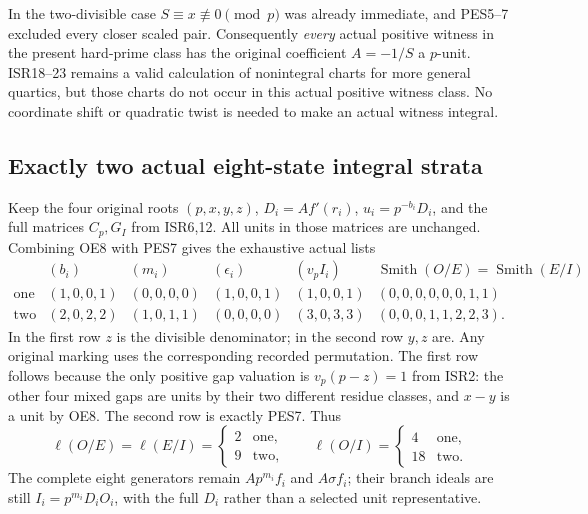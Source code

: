 In the two-divisible case $S\equiv x\not\equiv0\pmod p$ was
already immediate, and PES5--7 excluded every closer scaled pair.
Consequently \emph{every} actual positive witness in the present
hard-prime class has the original coefficient $A=-1/S$ a $p$-unit.
ISR18--23 remains a valid calculation of nonintegral charts for more
general quartics, but those charts do not occur in this actual
positive witness class. No coordinate shift or quadratic twist is
needed to make an actual witness integral.

\subsection{Exactly two actual eight-state integral strata}
Keep the four original roots $(p,x,y,z)$, $D_i=Af'(r_i)$,
$u_i=p^{-b_i}D_i$, and the full matrices $C_p,G_I$ from ISR6,12.
All units in those matrices are unchanged. Combining OE8 with
PES7 gives the exhaustive actual lists
\begin{equation}
 \begin{array}{c|c|c|c|c|c}
 & (b_i)&(m_i)&(\epsilon_i)&(v_pI_i)&
       \operatorname{Smith}(O/E)=\operatorname{Smith}(E/I)\\\hline
 \text{one}&(1,0,0,1)&(0,0,0,0)&(1,0,0,1)&(1,0,0,1)&
                  (0,0,0,0,0,0,1,1)\\
 \text{two}&(2,0,2,2)&(1,0,1,1)&(0,0,0,0)&(3,0,3,3)&
                  (0,0,0,1,1,2,2,3).
 \end{array}                                            \tag{OE9}
\end{equation}
In the first row $z$ is the divisible denominator; in the second
row $y,z$ are. Any original marking uses the corresponding recorded
permutation. The first row follows because the only positive gap
valuation is $v_p(p-z)=1$ from ISR2: the other four mixed gaps are
units by their two different residue classes, and $x-y$ is a unit
by OE8. The second row is exactly PES7. Thus
\begin{equation}
 \ell(O/E)=\ell(E/I)=\begin{cases}2&\text{one},\\9&\text{two},\end{cases}
 \qquad \ell(O/I)=\begin{cases}4&\text{one},\\18&\text{two}.
                      \end{cases}                      \tag{OE10}
\end{equation}
The complete eight generators remain $Ap^{m_i}f_i$ and
$A\sigma f_i$; their branch ideals are still
$I_i=p^{m_i}D_iO_i$, with the full $D_i$ rather than a selected
unit representative.

